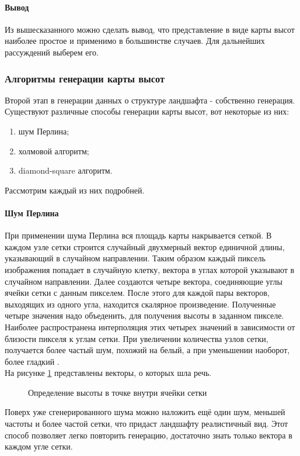 \documentclass{article}
\begin{document}
	\paragraph{Вывод}
	\indent Из вышесказанного можно сделать вывод, что представление в виде карты высот наиболее простое и применимо в большинстве случаев. Для дальнейших рассуждений выберем его.
	\subsubsection{Алгоритмы генерации карты высот}
	\indent Второй этап в генерации данных о структуре ландшафта - собственно генерация. Существуют различные способы генерации карты высот, вот некоторые из них:
           \begin{enumerate}
		\item шум Перлина;
		\item холмовой алгоритм;
		\item diamond-square алгоритм.
	\end{enumerate}
	Рассмотрим каждый из них подробней.
	\paragraph{Шум Перлина}
	\indent При применении шума Перлина вся площадь карты накрывается сеткой. В каждом узле сетки строится случайный двухмерный вектор единичной длины, указывающий в случайном направлении. Таким образом каждый пиксель изображения попадает в случайную клетку, вектора в углах которой указывают в случайном направлении. Далее создаются четыре вектора, соединяющие углы ячейки сетки с данным пикселем. После этого для каждой пары векторов, выходящих из одного угла, находится скалярное произведение. Полученные четыре значения надо объеденить, для получения высоты в заданном пикселе. Наиболее распространена интерполяция этих четырех значений в зависимости от близости пикселя к углам сетки. При увеличении количества узлов сетки, получается более частый шум, похожий на белый, а при уменьшении наоборот, более гладкий \cite{perlinNoise}.
\\ \indent На рисунке \hyperref[perlinDemonstrationSchema]{\ref{perlinDemonstrationSchema}} представлены векторы, о которых шла речь.
	\begin{figure}[H]
		 	\caption{Определение высоты в точке внутри ячейки сетки}
		 	\label{perlinDemonstrationSchema}
	 	\end{figure}
	\indent Поверх уже сгенерированного шума можно наложить ещё один шум, меньшей частоты и более частой сетки, что придаст ландшафту реалистичный вид. Этот способ позволяет легко повторить генерацию, достаточно знать только вектора в каждом угле сетки.
\end{document}
